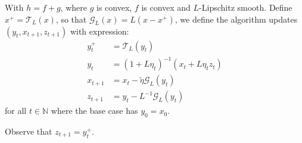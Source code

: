 \documentclass[12pt]{article}
\begin{document}
    \begin{definition}
    \label{def:ag_prox_grad_generic}
        With $h = f + g$, where $g$ is convex, $f$ is convex and $L$-Lipschitz smooth. 
        Define $x^+ = \mathcal T_L(x)$, so that $\mathcal G_L(x) = L(x -  x^+)$, we define the algorithm updates $(y_t, x_{t + 1}, z_{t + 1})$ with expression: 
        $$
        \begin{aligned}
            y_t^+ &= \mathcal T_L(y_t)
            \\
            y_t &= (1 + L\eta_t)^{-1}(x_t + L\eta_t z_t)
            \\
            x_{t + 1} &= x_t - \tilde \eta \mathcal G_L(y_t)
            \\
            z_{t + 1} &= y_t - L^{-1}\mathcal G_L(y_t)
        \end{aligned}
        $$
        for all $t\in \mathbb N$ where the base case has $y_0 = x_0$. 
    \end{definition}
    \begin{remark}
        Observe that $z_{t + 1} = y_t^+$. 
    \end{remark}
    
\end{document}
